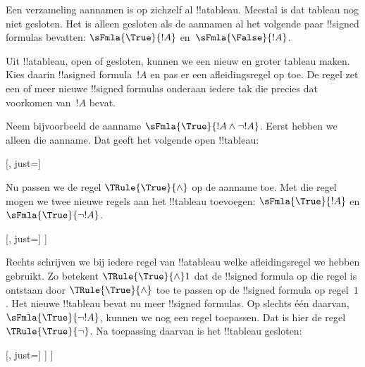 \documentclass[../../../include/open-logic-section]{subfiles}
\begin{document}
\begin{ex}
  Een verzameling aannamen is op zichzelf al !!a{tableau}. Meestal is
  dat tableau nog niet gesloten. Het is alleen gesloten als de aannamen
  al het volgende paar !!{signed formula}s bevatten:
  $\sFmla{\True}{!A}$ en~$\sFmla{\False}{!A}$.

  Uit !!a{tableau}, open of gesloten, kunnen we een nieuw en groter
  tableau maken. Kies daarin !!a{signed formula}~$!A$ en pas er een
  afleidingsregel op toe. De regel zet een of meer nieuwe
  !!{signed formula}s onderaan iedere tak die precies dat voorkomen
  van~$!A$ bevat.

  Neem bijvoorbeeld de aanname $\sFmla{\True}{!A \land \lnot
    !A}$. Eerst hebben we alleen die aanname. Dat geeft het volgende
  open !!{tableau}:
  \begin{center}
    \begin{tableau}{}
      [, just=\TAss]
    \end{tableau}{}
  \end{center}
  Nu passen we de regel $\TRule{\True}{\land}$ op de aanname toe. Met
  die regel mogen we twee nieuwe regels aan het !!{tableau} toevoegen:
  $\sFmla{\True}{!A}$ en $\sFmla{\True}{\lnot !A}$.
  \begin{center}
    \begin{tableau}{}
      [, just=\TAss
        [\sFmla{\True}{\formula{A}}, just={\TRule{\True}{\land}[1]},
          [\sFmla{\True}{\lnot \formula{A}}, just={\TRule{\True}{\land}[1]}
          ]
        ]
      ]
    \end{tableau}{}
  \end{center}
  Rechts schrijven we bij iedere regel van !!a{tableau} welke
  afleidingsregel we hebben gebruikt. Zo betekent
  $\TRule{\True}{\land} 1$ dat de !!{signed formula} op die regel is
  ontstaan door $\TRule{\True}{\land}$ toe te passen op de
  !!{signed formula} op regel~$1$. Het nieuwe !!{tableau} bevat nu meer
  !!{signed formula}s. Op slechts één daarvan,
  $\sFmla{\True}{\lnot !A}$, kunnen we nog een regel toepassen. Dat is
  hier de regel $\TRule{\True}{\lnot}$. Na toepassing daarvan is het
  !!{tableau} gesloten:
  \begin{center}
    \begin{tableau}{}
      [, just=\TAss
        [\sFmla{\True}{\formula{A}}, just={\TRule{\True}{\land}[1]}
          [\sFmla{\True}{\lnot \formula{A}}, just={\TRule{\True}{\land}[1]}
            [\sFmla{\False}{\formula{A}}, just={\TRule{\True}{\lnot}[3]}, close]
          ]
        ]
      ]
    \end{tableau}{}
  \end{center}
\end{ex}
\end{document}
